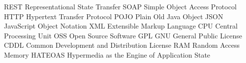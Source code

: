		{REST}		{Representational State Transfer}
		{SOAP}		{Simple Object Access Protocol}
		{HTTP}		{Hypertext Transfer Protocol}
		{POJO}		{Plain Old Java Object}
		{JSON}		{JavaScript Object Notation}
		{XML}		{Extensible Markup Language}
		{CPU}		{Central Processing Unit}
		{OSS}		{Open Source Software}
		{GPL}		{GNU General Public License}
		{CDDL}		{Common Development and Distribution License}
		{RAM}		{Random Access Memory}
	{HATEOAS}	{Hypermedia as the Engine of Application State}
